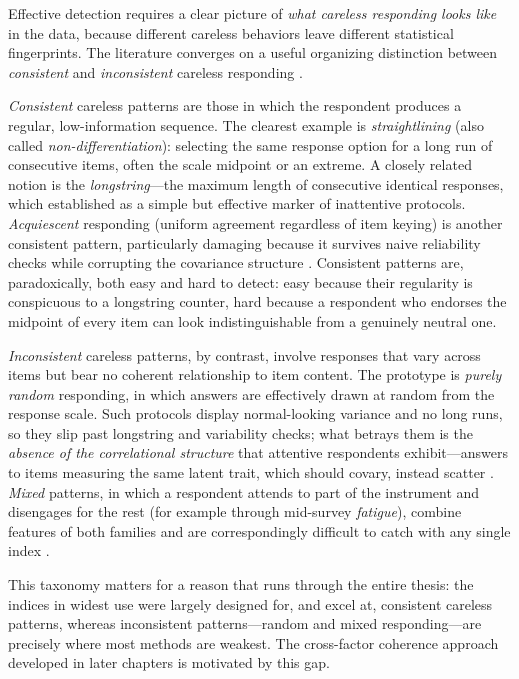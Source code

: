 \documentclass[doc,11pt,donotrepeattitle]{apa7}
\begin{document}
Effective detection requires a clear picture of \emph{what careless responding
looks like} in the data, because different careless behaviors leave different
statistical fingerprints. The literature converges on a useful organizing
distinction between \emph{consistent} and \emph{inconsistent} careless
responding \parencite{ward2023dealing, curran2016methods}.

\emph{Consistent} careless patterns are those in which the respondent produces
a regular, low-information sequence. The clearest example is
\emph{straightlining} (also called \emph{non-differentiation}): selecting the
same response option for a long run of consecutive items, often the scale
midpoint or an extreme. A closely related notion is the \emph{longstring}---the
maximum length of consecutive identical responses, which \textcite{johnson2005ascertaining}
established as a simple but effective marker of inattentive protocols.
\emph{Acquiescent} responding (uniform agreement regardless of item keying) is
another consistent pattern, particularly damaging because it survives naive
reliability checks while corrupting the covariance structure
\parencite{kam2015careless}. Consistent patterns are, paradoxically, both easy
and hard to detect: easy because their regularity is conspicuous to a longstring
counter, hard because a respondent who endorses the midpoint of every item can
look indistinguishable from a genuinely neutral one.

\emph{Inconsistent} careless patterns, by contrast, involve responses that vary
across items but bear no coherent relationship to item content. The prototype is
\emph{purely random} responding, in which answers are effectively drawn at
random from the response scale. Such protocols display normal-looking variance
and no long runs, so they slip past longstring and variability checks; what
betrays them is the \emph{absence of the correlational structure} that attentive
respondents exhibit---answers to items measuring the same latent trait, which
should covary, instead scatter \parencite{meade2012identifying, curran2016methods}.
\emph{Mixed} patterns, in which a respondent attends to part of the instrument
and disengages for the rest (for example through mid-survey
\emph{fatigue}), combine features of both families and are correspondingly
difficult to catch with any single index \parencite{ward2023dealing}.

This taxonomy matters for a reason that runs through the entire thesis: the
indices in widest use were largely designed for, and excel at, consistent
careless patterns, whereas inconsistent patterns---random and mixed
responding---are precisely where most methods are weakest. The cross-factor
coherence approach developed in later chapters is motivated by this gap.
\end{document}
